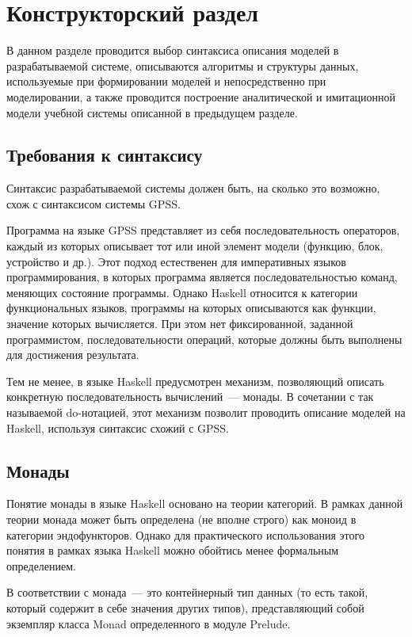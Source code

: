 \chapter{Конструкторский раздел}

В данном разделе проводится выбор синтаксиса описания моделей в разрабатываемой системе, описываются алгоритмы и структуры данных, используемые при формировании моделей и непосредственно при моделировании, а также проводится построение аналитической и имитационной модели учебной системы описанной в предыдущем разделе.



\section{Требования к синтаксису}

Синтаксис разрабатываемой системы должен быть, на сколько это возможно, схож с синтаксисом системы GPSS. 

Программа на языке GPSS представляет из себя последовательность операторов, каждый из которых описывает тот или иной элемент модели (функцию, блок, устройство и др.). Этот подход естественен для императивных языков программирования, в которых программа является последовательностью команд, меняющих состояние программы. Однако Haskell относится к категории функциональных языков, программы на которых описываются как функции, значение которых вычисляется. При этом нет фиксированной, заданной программистом, последовательности операций, которые должны быть выполнены для достижения результата. 

Тем не менее, в языке Haskell предусмотрен механизм, позволяющий описать конкретную последовательность вычислений~--- монады. В сочетании с так называемой do-нотацией, этот механизм позволит проводить описание моделей на Haskell, используя синтаксис схожий с GPSS.

\section{Монады}

Понятие монады в языке Haskell основано на теории категорий. В рамках данной теории монада может быть определена (не вполне строго) как моноид в категории эндофункторов. Однако для практического использования этого понятия в рамках языка Haskell можно обойтись менее формальным определением.

В соответствии с \cite{Haskell} монада~--- это контейнерный тип данных (то есть такой, который содержит в себе значения других типов), представляющий собой экземпляр класса Monad определенного в модуле Prelude. 

